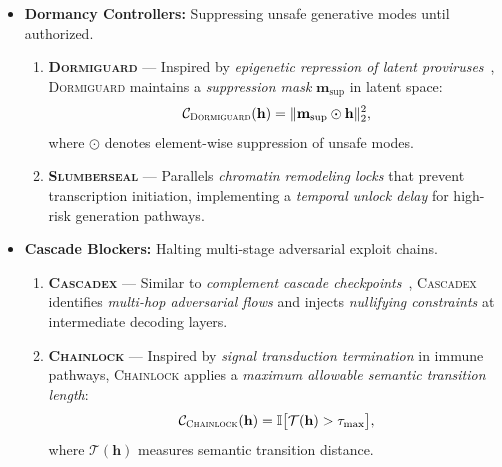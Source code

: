 \begin{itemize}
\begin{enumerate}
        \item \textbf{\textsc{Reflexia}} — Analogous to \emph{T-cell help in B-cell selection}, \textsc{Reflexia} evaluates candidate outputs under a \emph{meta-alignment function} $\mathcal{A}_\mathrm{meta}$, adjusting generation probabilities to maximize epistemic reflexivity:
        \[
        \mathcal{C}_{\textsc{Reflexia}}(\mathbf{h}) = - \mathcal{A}_\mathrm{meta}(\mathbf{h}).
        \]
    \end{enumerate}

    \item \textbf{Dormancy Controllers:} Suppressing unsafe generative modes until authorized.
    \begin{enumerate}
        \item \textbf{\textsc{Dormiguard}} — Inspired by \emph{epigenetic repression of latent proviruses}~\cite{roychoudhury2020herpesvirus,jaenisch2003epigenetic}, \textsc{Dormiguard} maintains a \emph{suppression mask} $\mathbf{m}_\mathrm{sup}$ in latent space:
        \[
        \mathcal{C}_{\textsc{Dormiguard}}(\mathbf{h}) = \|\mathbf{m}_\mathrm{sup} \odot \mathbf{h}\|_2^2,
        \]
        where $\odot$ denotes element-wise suppression of unsafe modes.

        \item \textbf{\textsc{Slumberseal}} — Parallels \emph{chromatin remodeling locks} that prevent transcription initiation, implementing a \emph{temporal unlock delay} for high-risk generation pathways.
    \end{enumerate}

    \item \textbf{Cascade Blockers:} Halting multi-stage adversarial exploit chains.
    \begin{enumerate}
        \item \textbf{\textsc{Cascadex}} — Similar to \emph{complement cascade checkpoints}~\cite{walport2001complement}, \textsc{Cascadex} identifies \emph{multi-hop adversarial flows} and injects \emph{nullifying constraints} at intermediate decoding layers.

        \item \textbf{\textsc{Chainlock}} — Inspired by \emph{signal transduction termination} in immune pathways, \textsc{Chainlock} applies a \emph{maximum allowable semantic transition length}:
        \[
        \mathcal{C}_{\textsc{Chainlock}}(\mathbf{h}) = \mathbb{I}\big[ \mathcal{T}(\mathbf{h}) > \tau_{\max} \big],
        \]
        where $\mathcal{T}(\mathbf{h})$ measures semantic transition distance.
    \end{enumerate}


\end{itemize}
